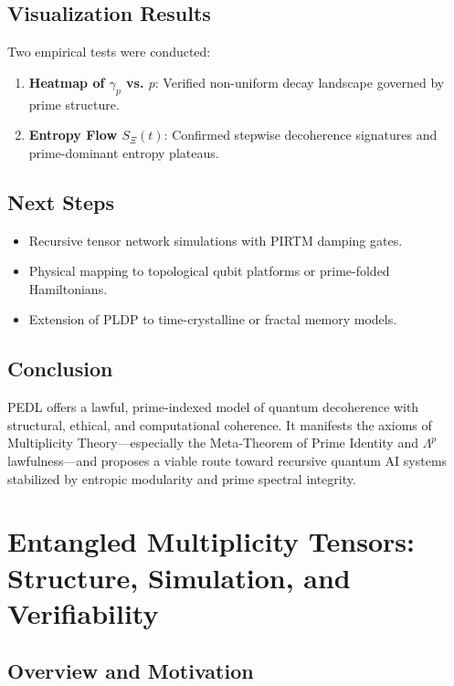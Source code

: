 \documentclass[12]{amsart}
\theoremstyle{plain}
\begin{document}
\subsection{Visualization Results}

Two empirical tests were conducted:

\begin{enumerate}
    \item \textbf{Heatmap of $\gamma_p$ vs. $p$}: Verified non-uniform decay landscape governed by prime structure.
    \item \textbf{Entropy Flow $S_\Xi(t)$}: Confirmed stepwise decoherence signatures and prime-dominant entropy plateaus.
\end{enumerate}

\subsection{Next Steps}

\begin{itemize}
    \item Recursive tensor network simulations with PIRTM damping gates.
    \item Physical mapping to topological qubit platforms or prime-folded Hamiltonians.
    \item Extension of PLDP to time-crystalline or fractal memory models.
\end{itemize}

\subsection{Conclusion}

PEDL offers a lawful, prime-indexed model of quantum decoherence with structural, ethical, and computational coherence. It manifests the axioms of Multiplicity Theory—especially the Meta-Theorem of Prime Identity and $\Lambda^p$ lawfulness—and proposes a viable route toward recursive quantum AI systems stabilized by entropic modularity and prime spectral integrity.

\section{Entangled Multiplicity Tensors: Structure, Simulation, and Verifiability}

\subsection{Overview and Motivation}
\end{document}
